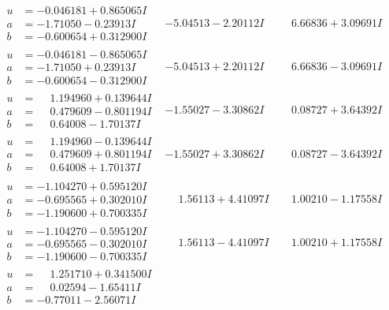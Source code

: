 \documentclass[1p]{elsarticle_modified}
\theoremstyle{definition}
\begin{document}
$$\begin{array}{c|c|c}
\begin{aligned}
u &= -0.046181 + 0.865065 I \\
a &= -1.71050 - 0.23913 I \\
b &= -0.600654 + 0.312900 I\end{aligned}
 & -5.04513 - 2.20112 I & \phantom{-}6.66836 + 3.09691 I \\ \hline\begin{aligned}
u &= -0.046181 - 0.865065 I \\
a &= -1.71050 + 0.23913 I \\
b &= -0.600654 - 0.312900 I\end{aligned}
 & -5.04513 + 2.20112 I & \phantom{-}6.66836 - 3.09691 I \\ \hline\begin{aligned}
u &= \phantom{-}1.194960 + 0.139644 I \\
a &= \phantom{-}0.479609 - 0.801194 I \\
b &= \phantom{-}0.64008 - 1.70137 I\end{aligned}
 & -1.55027 - 3.30862 I & \phantom{-}0.08727 + 3.64392 I \\ \hline\begin{aligned}
u &= \phantom{-}1.194960 - 0.139644 I \\
a &= \phantom{-}0.479609 + 0.801194 I \\
b &= \phantom{-}0.64008 + 1.70137 I\end{aligned}
 & -1.55027 + 3.30862 I & \phantom{-}0.08727 - 3.64392 I \\ \hline\begin{aligned}
u &= -1.104270 + 0.595120 I \\
a &= -0.695565 + 0.302010 I \\
b &= -1.190600 + 0.700335 I\end{aligned}
 & \phantom{-}1.56113 + 4.41097 I & \phantom{-}1.00210 - 1.17558 I \\ \hline\begin{aligned}
u &= -1.104270 - 0.595120 I \\
a &= -0.695565 - 0.302010 I \\
b &= -1.190600 - 0.700335 I\end{aligned}
 & \phantom{-}1.56113 - 4.41097 I & \phantom{-}1.00210 + 1.17558 I \\ \hline\begin{aligned}
u &= \phantom{-}1.251710 + 0.341500 I \\
a &= \phantom{-}0.02594 - 1.65411 I \\
b &= -0.77011 - 2.56071 I\end{aligned}

\end{array}$$
\end{document}
